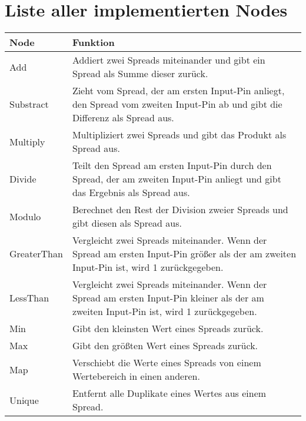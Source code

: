 \documentclass[a4paper, 
               12pt,
               DIV=calc,
               version=first,
               pdftex,
               headsepline,
               footsepline,
               bibtotocnumbered,
               liststotocnumbered]{scrreprt}
\begin{document}
\section{Liste aller implementierten Nodes}
\label{sec:alleNodes}
\centering
\begin{tabular}{|l|p{10cm}|}
\hline
\textbf{Node} & \textbf{Funktion}\\
\hline
Add & Addiert zwei Spreads miteinander und gibt ein Spread als Summe dieser zurück.\\
\hline
Substract & Zieht vom Spread, der am ersten Input-Pin anliegt, den Spread vom zweiten Input-Pin ab und gibt die Differenz als Spread aus.\\
\hline
Multiply & Multipliziert zwei Spreads und gibt das Produkt als Spread aus.\\
\hline
Divide & Teilt den Spread am ersten Input-Pin durch den Spread, der am zweiten Input-Pin anliegt und gibt das Ergebnis als Spread aus.\\
\hline
Modulo & Berechnet den Rest der Division zweier Spreads und gibt diesen als Spread aus.\\
\hline
GreaterThan & Vergleicht zwei Spreads miteinander. Wenn der Spread am ersten Input-Pin größer
als der am zweiten Input-Pin ist, wird 1 zurückgegeben.\\
\hline
LessThan & Vergleicht zwei Spreads miteinander. Wenn der Spread am ersten Input-Pin kleiner
als der am zweiten Input-Pin ist, wird 1 zurückgegeben.\\
\hline
Min & Gibt den kleinsten Wert eines Spreads zurück.\\
\hline
Max & Gibt den größten Wert eines Spreads zurück.\\
\hline
Map & Verschiebt die Werte eines Spreads von einem Wertebereich in einen anderen.\\
\hline
Unique & Entfernt alle Duplikate eines Wertes aus einem Spread.\\
\hline
\end{tabular}
\end{document}

